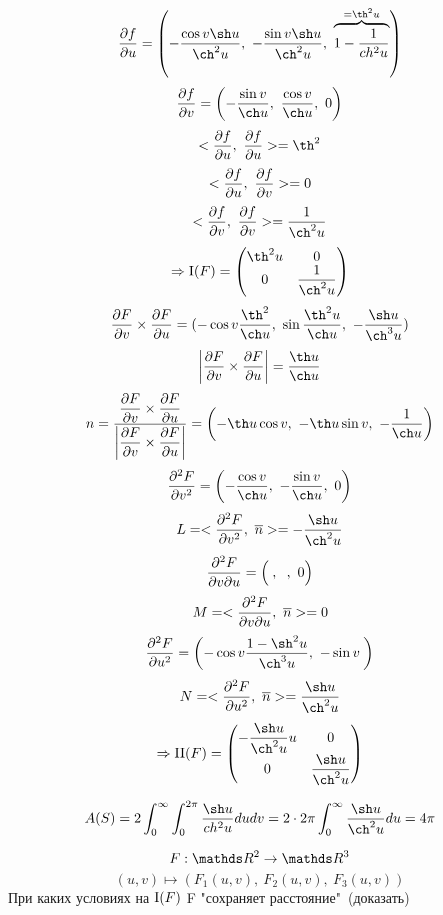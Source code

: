 \documentclass[main]{subfiles}
\begin{document}
    \begin{Sol}
      \[\dfrac{\d f}{\d u} = \Br{-\dfrac{\cos v \sh u}{\ch^2 u},\ -\dfrac{\sin v \sh u}{\ch^2 u},\ \ob{= \th^2 u}{1 - \dfrac{1}{ch^2 u}}}\]
      \[\dfrac{\d f}{\d v} = \Br{-\dfrac{\sin v}{\ch u},\ \dfrac{\cos v}{\ch u},\ 0}\]
      \[<\dfrac{\d f}{\d u},\ \dfrac{\d f}{\d u}> = \th^2\]
      \[<\dfrac{\partial f}{\partial u},\ \dfrac{\partial f}{\partial v}> = 0\]
      \[<\dfrac{\d f}{\d v},\ \dfrac{\d f}{\d v}> = \dfrac{1}{\ch^2 u}\]
      \[\Ra \RNumb{1}(F) = \begin{pmatrix}
        {}\th^2 u & 0\\
        0 & \dfrac{1}{\ch^2 u}
      \end{pmatrix}\]
      \[\frac{\d F}{\d v} \times \frac{\d F}{\d u} =
      (
        -\cos v \dfrac{\th^2}{\ch u},\
        \sin \dfrac{\th^2 u}{\ch u},\
        -\dfrac{\sh u}{\ch^3 u}
      )\]
      \[\abs{\dfrac{\d F}{\d v} \times \dfrac{\d F}{\d u}} = \dfrac{\th u}{\ch u}\]
      \[n =
      \dfrac{
        \dfrac{\d F}{\d v} \times \dfrac{\d F}{\d u}
      }{
        \abs{\dfrac{\d F}{\d v} \times \dfrac{\d F}{\d u}}
      } = \Br{- \th u \cos v,\ -\th u \sin v,\ -\dfrac{1}{\ch u}}\]
      \[\frac{\d^2 F}{\d v^2} = \Br{-\dfrac{\cos v}{\ch u},\ -\dfrac{\sin v}{\ch u},\ 0}\]
      \[L = <\frac{\d^2 F}{\d v^2},\ \ol{n}> = -\dfrac{\sh u}{\ch^2 u}\]
      \[\frac{\partial^2 F}{\partial v \partial u} = \left(\dfrac{}{},\ \dfrac{}{},\ 0\right)\]
      \[M = <\frac{\partial^2 F}{\partial v \partial u},\ \overline{n}> = 0\]
      \[\frac{\d^2 F}{\d u^2} = \Br{-\cos v \dfrac{1-\sh^2 u}{\ch^3 u},\ -\sin v \dfrac{}{}}\]
      \[N = <\frac{\d^2 F}{\d u^2},\ \ol{n}> = \dfrac{\sh u}{\ch^2 u}\]
      \[\Ra \RNumb{2}(F) = \begin{pmatrix}
        -\dfrac{\sh u}{\ch^2 u} u & 0\\
        0 & \dfrac{\sh u}{\ch^2 u}
      \end{pmatrix}\]

      \begin{figure}[H]
          \centering
      \end{figure}

      \[A(S) = 2 \int_0^{\infty} \int_0^{2\pi} \dfrac{\sh u}{ch^2 u} du dv = 2 \cdot 2\pi \int_0^{\infty} \dfrac{\sh u}{\ch^2 u} du = 4\pi\]
    \end{Sol}

    \begin{Example}
      \[F: \R^2 \ra \R^3\]
      \[(u,v) \mapsto (F_1(u,v),\ F_2(u,v),\ F_3 (u,v))\]
      При каких условиях на $\RNumb{1}(F)$ F "сохраняет расстояние"\ (доказать)
    \end{Example}
\end{document}
